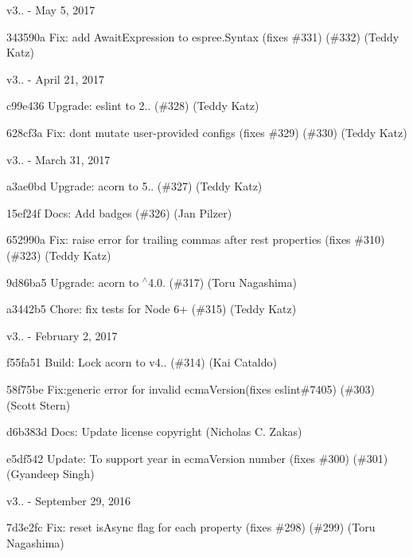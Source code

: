 v3.. -\/ May 5, 2017


\begin{DoxyItemize}
\item 343590a Fix\+: add Await\+Expression to espree.\+Syntax (fixes \#331) (\#332) (Teddy Katz)
\end{DoxyItemize}

v3.. -\/ April 21, 2017


\begin{DoxyItemize}
\item c99e436 Upgrade\+: eslint to 2.. (\#328) (Teddy Katz)
\item 628cf3a Fix\+: don\textquotesingle{}t mutate user-\/provided configs (fixes \#329) (\#330) (Teddy Katz)
\end{DoxyItemize}

v3.. -\/ March 31, 2017


\begin{DoxyItemize}
\item a3ae0bd Upgrade\+: acorn to 5.. (\#327) (Teddy Katz)
\item 15ef24f Docs\+: Add badges (\#326) (Jan Pilzer)
\item 652990a Fix\+: raise error for trailing commas after rest properties (fixes \#310) (\#323) (Teddy Katz)
\item 9d86ba5 Upgrade\+: acorn to $^\wedge$4.0. (\#317) (Toru Nagashima)
\item a3442b5 Chore\+: fix tests for Node 6+ (\#315) (Teddy Katz)
\end{DoxyItemize}

v3.. -\/ February 2, 2017


\begin{DoxyItemize}
\item f55fa51 Build\+: Lock acorn to v4.. (\#314) (Kai Cataldo)
\item 58f75be Fix\+:generic error for invalid ecma\+Version(fixes eslint\#7405) (\#303) (Scott Stern)
\item d6b383d Docs\+: Update license copyright (Nicholas C. Zakas)
\item e5df542 Update\+: To support year in ecma\+Version number (fixes \#300) (\#301) (Gyandeep Singh)
\end{DoxyItemize}

v3.. -\/ September 29, 2016


\begin{DoxyItemize}
\item 7d3e2fc Fix\+: reset {\ttfamily is\+Async} flag for each property (fixes \#298) (\#299) (Toru Nagashima)
\end{DoxyItemize}

